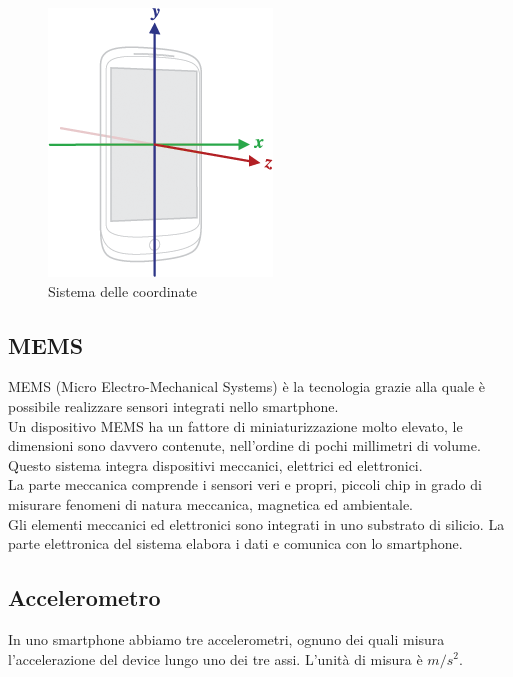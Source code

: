 \documentclass[12pt,a4paper,openright,twoside]{report}
\begin{document}
\begin{figure}[h] 
\centering 
\includegraphics[scale=0.8]{fig2} 
\caption{Sistema delle coordinate} 
\end{figure}

\subsection{MEMS}
MEMS (Micro Electro-Mechanical Systems) è la tecnologia grazie alla quale è possibile realizzare sensori integrati nello smartphone.\\
Un dispositivo MEMS ha un fattore di miniaturizzazione molto elevato, le dimensioni sono davvero contenute, nell'ordine di pochi millimetri di volume.\\
Questo sistema integra dispositivi meccanici, elettrici ed elettronici.\\
La parte meccanica comprende i sensori veri e propri, piccoli chip in grado di misurare fenomeni di natura meccanica, magnetica ed ambientale.\\
Gli elementi meccanici ed elettronici sono integrati in uno substrato di silicio. La parte elettronica del sistema elabora i dati e comunica con lo smartphone. \cite{K14}

\subsection{Accelerometro}
In uno smartphone abbiamo tre accelerometri, ognuno dei quali misura l'accelerazione del device lungo uno dei tre assi. L'unità di misura è $m/s^2$.
\end{document}
